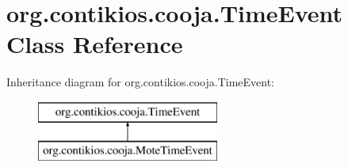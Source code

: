 \hypertarget{classorg_1_1contikios_1_1cooja_1_1TimeEvent}{\section{org.\-contikios.\-cooja.\-Time\-Event Class Reference}
\label{classorg_1_1contikios_1_1cooja_1_1TimeEvent}
}
Inheritance diagram for org.\-contikios.\-cooja.\-Time\-Event\-:\begin{figure}[H]
\begin{center}
\leavevmode
\includegraphics[height=2.000000cm]{classorg_1_1contikios_1_1cooja_1_1TimeEvent}
\end{center}
\end{figure}
